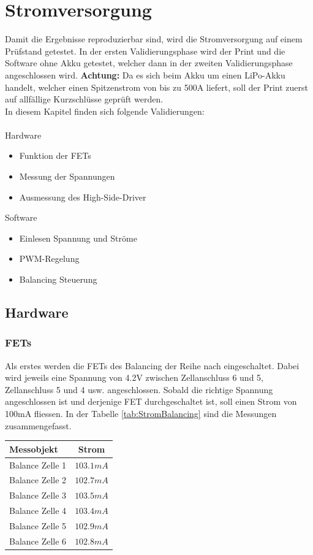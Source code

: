 \section{Stromversorgung} \label{ValidStromversorgung}

Damit die Ergebnisse reproduzierbar sind, wird die Stromversorgung auf einem Prüfstand getestet. In der ersten Validierungsphase wird der Print und die Software ohne Akku getestet, welcher dann in der zweiten Validierungsphase angeschlossen wird. \textbf{Achtung:} Da es sich beim Akku um einen LiPo-Akku handelt, welcher einen Spitzenstrom von bis zu 500A liefert, soll der Print zuerst auf allfällige Kurzschlüsse geprüft werden.   
\\
In diesem Kapitel finden sich folgende Validierungen:\\
\\
Hardware
\begin{itemize}
	\item Funktion der FETs
	\item Messung der Spannungen
	\item Ausmessung des High-Side-Driver
\end{itemize}
Software
\begin{itemize}
	\item Einlesen Spannung und Ströme
	\item PWM-Regelung
	\item Balancing Steuerung
\end{itemize}

\subsection{Hardware}
\subsubsection*{FETs}
Als erstes werden die FETs des Balancing der Reihe nach eingeschaltet. Dabei wird jeweils eine Spannung von 4.2V zwischen Zellanschluss 6 und 5, Zellanschluss 5 und 4 usw. angeschlossen. Sobald die richtige Spannung angeschlossen ist und derjenige FET durchgeschaltet ist, soll einen Strom von 100mA fliessen. In der Tabelle \ref{tab:StromBalancing} sind die Messungen zusammengefasst.

\begin{center}
	\begin{tabular}{l|c}
		Messobjekt & Strom \\ \hline
		Balance Zelle 1 & $103.1mA$ \\ \hline
		Balance Zelle 2 & $102.7mA$ \\ \hline
		Balance Zelle 3 & $103.5mA$ \\ \hline
		Balance Zelle 4 & $103.4mA$ \\ \hline
		Balance Zelle 5 & $102.9mA$ \\ \hline
		Balance Zelle 6 & $102.8mA$ \\ \hline
	\end{tabular} 
	\label{tab:StromBalancing}
\end{center}


